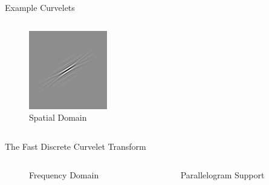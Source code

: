 \documentclass[mathserif]{beamer}
\begin{document}
\begin{frame}{Example Curvelets}
\begin{columns}
\begin{column}{.5\textwidth}
\begin{figure}
                \includegraphics[width=.5\textwidth]{illustrations/curvelet_examples/curvelet_2_time}
                \caption{Spatial Domain}
            \end{figure}
        \end{column}
    \end{columns}
\end{frame}

\begin{frame}{The Fast Discrete Curvelet Transform}
    \begin{columns}
        \begin{column}{.5\textwidth}
            \begin{figure}
                
                \caption{Frequency Domain}
            \end{figure}
        \end{column}
        \begin{column}{.5\textwidth}
            \begin{figure}
                
                \caption{Parallelogram Support}
            \end{figure}
        \end{column}
    \end{columns}
\end{frame}
\end{document}

